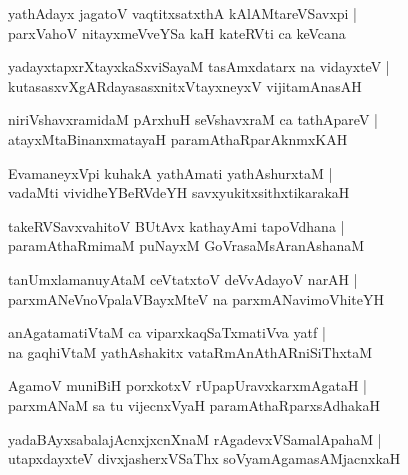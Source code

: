 \documentclass[twoside,12pt,openright]{book}
\newcounter{shloka}[chapter]
\begin{document}
\begin{shloka}%
yathAdayx jagatoV vaqtitxsatxthA kAlAMtareVSavxpi |\\
parxVahoV nitayxmeVveYSa kaH kateRVti ca keVcana 
\end{shloka}

\begin{shloka}%
yadayxtapxrXtayxkaSxviSayaM tasAmxdatarx na vidayxteV |\\
kutasasxvXgARdayasasxnitxVtayxneyxV vijitamAnasAH 
\end{shloka}

\begin{shloka}%
niriVshavxramidaM pArxhuH seVshavxraM ca tathApareV |\\
atayxMtaBinanxmatayaH paramAthaRparAknmxKAH 
\end{shloka}

\begin{shloka}%
EvamaneyxVpi kuhakA yathAmati yathAshurxtaM |\\
vadaMti vividheYBeRVdeYH savxyukitxsithxtikarakaH 
\end{shloka}

\begin{shloka}%
takeRVSavxvahitoV BUtAvx kathayAmi tapoVdhana |\\
paramAthaRmimaM puNayxM GoVrasaMsAranAshanaM
\end{shloka}

\begin{shloka}%
tanUmxlamanuyAtaM ceVtatxtoV deVvAdayoV narAH |\\
parxmANeVnoVpalaVBayxMteV na parxmANavimoVhiteYH 
\end{shloka}

\begin{shloka}%
anAgatamatiVtaM ca viparxkaqSaTxmatiVva yatf |\\
na gaqhiVtaM yathAshakitx vataRmAnAthARniSiThxtaM 
\end{shloka}

\begin{shloka}%
AgamoV muniBiH porxkotxV rUpapUravxkarxmAgataH |\\
parxmANaM sa tu vijecnxVyaH paramAthaRparxsAdhakaH
\end{shloka}

\begin{shloka}%
yadaBAyxsabalajAcnxjxcnXnaM rAgadevxVSamalApahaM |\\
utapxdayxteV divxjasherxVSaThx soVyamAgamasAMjacnxkaH
\end{shloka}
\end{document}
